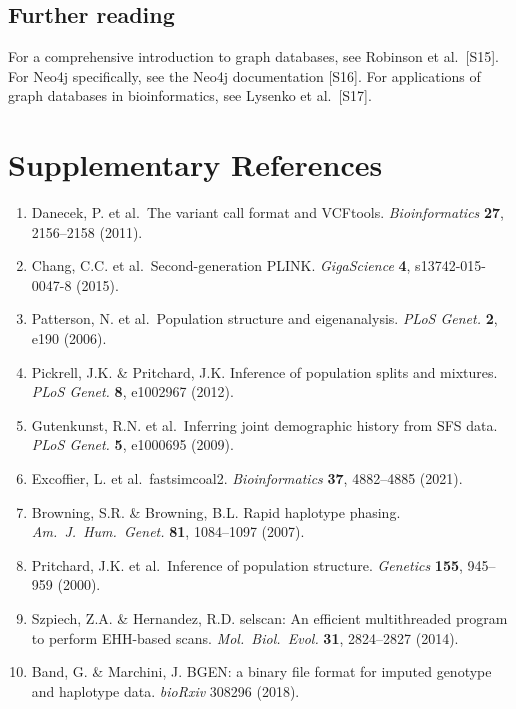 \documentclass[11pt,a4paper]{article}
\begin{document}
\subsection*{Further reading}

For a comprehensive introduction to graph databases, see Robinson et al.\ [S15]. For Neo4j specifically, see the Neo4j documentation [S16]. For applications of graph databases in bioinformatics, see Lysenko et al.\ [S17].

\newpage

\section{Supplementary References}

\begin{enumerate}
\item[{[S1]}] Danecek, P. et al.\ The variant call format and VCFtools. \textit{Bioinformatics} \textbf{27}, 2156--2158 (2011).
\item[{[S2]}] Chang, C.C. et al.\ Second-generation PLINK. \textit{GigaScience} \textbf{4}, s13742-015-0047-8 (2015).
\item[{[S3]}] Patterson, N. et al.\ Population structure and eigenanalysis. \textit{PLoS Genet.} \textbf{2}, e190 (2006).
\item[{[S4]}] Pickrell, J.K. \& Pritchard, J.K. Inference of population splits and mixtures. \textit{PLoS Genet.} \textbf{8}, e1002967 (2012).
\item[{[S5]}] Gutenkunst, R.N. et al.\ Inferring joint demographic history from SFS data. \textit{PLoS Genet.} \textbf{5}, e1000695 (2009).
\item[{[S6]}] Excoffier, L. et al.\ fastsimcoal2. \textit{Bioinformatics} \textbf{37}, 4882--4885 (2021).
\item[{[S7]}] Browning, S.R. \& Browning, B.L. Rapid haplotype phasing. \textit{Am.\ J.\ Hum.\ Genet.} \textbf{81}, 1084--1097 (2007).
\item[{[S8]}] Pritchard, J.K. et al.\ Inference of population structure. \textit{Genetics} \textbf{155}, 945--959 (2000).
\item[{[S9]}] Szpiech, Z.A. \& Hernandez, R.D. selscan: An efficient multithreaded program to perform EHH-based scans. \textit{Mol.\ Biol.\ Evol.} \textbf{31}, 2824--2827 (2014).
\item[{[S10]}] Band, G. \& Marchini, J. BGEN: a binary file format for imputed genotype and haplotype data. \textit{bioRxiv} 308296 (2018).

\end{enumerate}
\end{document}
